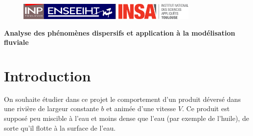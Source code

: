 \documentclass[12pt,a4paper]{article}
\begin{document}
\begin{figure}[t]
    \centering
    \includegraphics[width=5cm]{src/inp_n7.png}
    \hfill
    \includegraphics[width=3.8cm]{src/insa_toulouse.png}
\end{figure}

\begin{center}
    \textbf{\LARGE Analyse des phénomènes dispersifs et application à la modélisation
    fluviale}
\end{center}

\vspace{0.5cm}

\begin{center}
\end{center}


\section*{Introduction}
On souhaite étudier dans ce projet le comportement d’un produit déversé dans une rivière de largeur constante $b$ et animée d’une vitesse $V$.
Ce produit est supposé peu miscible à l’eau et moins dense que l’eau (par exemple de l’huile), de sorte qu’il flotte à la surface de l’eau.
\end{document}

